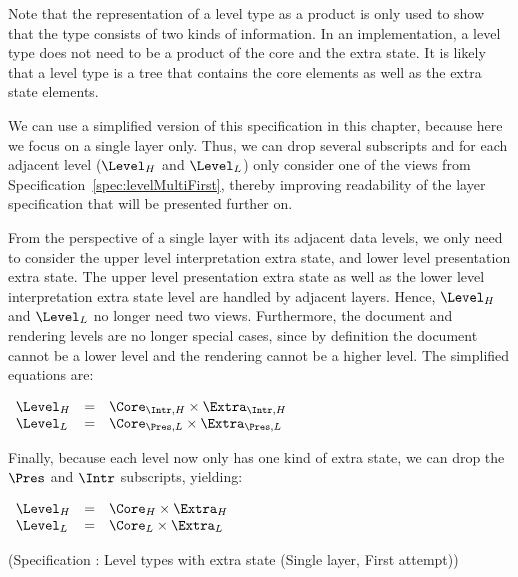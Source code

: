 Note that the representation of a level type as a product is only used to show that the type consists of two kinds of information. In an implementation, a level type does not need to be a product of the core and the extra state. It is likely that a level type is a tree that contains the core elements as well as the extra state elements.

We can use a simplified version of this specification in this chapter, because here we focus on a single layer only. Thus, we can drop several subscripts and for each adjacent level ($\Level_{H}$ and $\Level_{L}$) only consider one of the views from Specification~\ref{spec:levelMultiFirst}, thereby improving readability of the layer specification that will be presented further on. 

From the perspective of a single layer with its adjacent data levels, we only need to consider the upper level interpretation extra state, and lower level presentation extra state. The upper level presentation extra state as well as the lower level interpretation extra state level are handled by adjacent layers. Hence, $\Level_{H}$ and $\Level_{L}$ no longer need two views. Furthermore, the document and rendering levels are no longer special cases, since by definition the document cannot be a lower level and the rendering cannot be a higher level. The simplified equations are:

\begin{small}\( \begin{array}{lcll}
\Level_{H} & = & \Core_{\Intr, H} \times \Extra_{\Intr, H}\\
\Level_{L} & = & \Core_{\Pres, L} \times \Extra_{\Pres, L}\\
\end{array}\)\end{small}

Finally, because each level now only has one kind of extra state, we can drop the $\Pres$ and $\Intr$ subscripts, yielding:

\begin{small}
 \label{spec:levelSingleFirst}
\( \begin{array}{lcll}
\Level_{H} & = & \Core_{H} \times \Extra_{H}\\
\Level_{L} & = & \Core_{L} \times \Extra_{L}\\
\end{array}\)\end{small}
\begin{center}(Specification \thespecification: Level types with extra state (Single layer, First attempt))\end{center}


